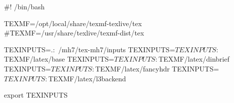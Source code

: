 #! /bin/bash

TEXMF=/opt/local/share/texmf-texlive/tex
#TEXMF=/usr/share/texlive/texmf-dist/tex

TEXINPUTS=.:~/mh7/tex-mh7/inputs
TEXINPUTS=$TEXINPUTS:$TEXMF/latex/base
TEXINPUTS=$TEXINPUTS:$TEXMF/latex/dinbrief
TEXINPUTS=$TEXINPUTS:$TEXMF/latex/fancyhdr
TEXINPUTS=$TEXINPUTS:$TEXMF/latex/l3backend


export TEXINPUTS
